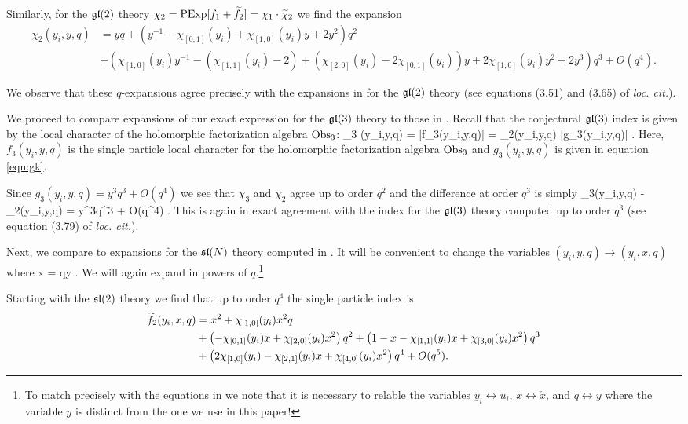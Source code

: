 Similarly, for the $\mathfrak{gl}(2)$ theory $\chi_2 = \text{PExp}[f_1 + \widetilde f_2] = \chi_1 \cdot \widetilde \chi_2$ we find the expansion
\begin{align*}
\chi_2 (y_i,y,q) & = y q + \left(y^{-1} - \chi_{[0,1]}(y_i) + \chi_{[1,0]}(y_i) y + 2y^2 \right) q^2 \\ 
& + \left( \chi_{[1,0]}(y_i) y^{-1} - (\chi_{[1,1]}(y_i)-2) + (\chi_{[2,0]}(y_i) - 2 \chi_{[0,1]}(y_i)) y + 2 \chi_{[1,0]}(y_i) y^2 + 2y^3\right) q^3 + O(q^4) .
\end{align*}

We observe that these $q$-expansions agree precisely with the expansions in \cite{Kim:2013nva} for the $\mathfrak{gl}(2)$ theory  
(see equations (3.51) and (3.65) of \textit{loc. cit.}).

\parsec

We proceed to compare expansions of our exact expression for the $\mathfrak{gl}(3)$ theory to those in \cite{Kim:2031nva}. 
Recall that the conjectural $\mathfrak{gl}(3)$ index is given by the local character of the holomorphic factorization algebra $\operatorname{Obs}_3$:
\beqn
\chi_3 (y_i,y,q) = [f_3(y_i,y,q)] = \chi_2(y_i,y,q) \cdot {}[g_3(y_i,y,q)]  .
\eeqn
Here, $f_3(y_i,y,q)$ is the single particle local character for the holomorphic factorization algebra $\operatorname{Obs}_3$ and $g_3(y_i,y,q)$ is given in equation \eqref{eqn:gk}. 

Since $g_3(y_i,y,q) = y^3 q^3 + O(q^4)$ we see that $\chi_3$ and $\chi_2$ agree up to order $q^2$ and the difference at order $q^3$ is simply
\beqn
\chi_3(y_i,y,q) - \chi_2(y_i,y,q) = y^3q^3 + O(q^4) .
\eeqn
This is again in exact agreement with the index for the $\mathfrak{gl}(3)$ theory computed \cite{Kim:2013nva} up to order $q^3$ (see equation (3.79) of \textit{loc. cit.}). 

\parsec

Next, we compare to expansions for the $\mathfrak{sl}(N)$ theory computed in \cite{Imamura}.
It will be convenient to change the variables $(y_i, y, q) \to (y_i,x,q)$ where 
\beqn
x = qy .
\eeqn 
We will again expand in powers of $q$.\footnote{To match precisely with the equations in \cite{Imamura} we note that it is necessary to relable the variables $y_i \leftrightarrow u_i$, $x \leftrightarrow \check{x}$, and $q \leftrightarrow y$ where the variable $y$ is distinct from the one we use in this paper!}

Starting with the $\mathfrak{sl}(2)$ theory we find that up to order $q^4$ the single particle index is
\begin{align*}
\widetilde f_2 (y_i,x,q) & = x^2 + \chi_{[1,0]}(y_i) x^2 q \\
& + \left(-\chi_{[0,1]}(y_i) x + \chi_{[2,0]}(y_i) x^2 \right) q^2 +  \left(1-x-\chi_{[1,1]}(y_i) x + \chi_{[3,0]}(y_i) x^2 \right) q^3 \\
& + \left(2 \chi_{[1,0]}(y_i) - \chi_{[2,1]}(y_i) x + \chi_{[4,0]}(y_i)x^2 \right)q^4 + O(q^5) .
\end{align*}


